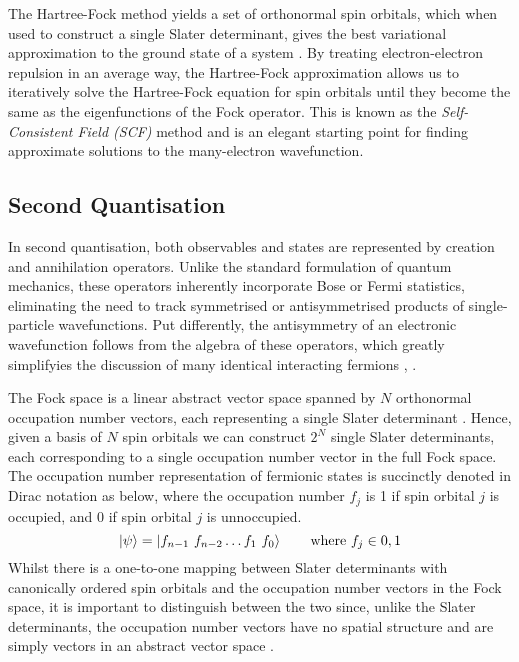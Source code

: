 The Hartree-Fock method yields a set of orthonormal spin orbitals, which when used to construct a single Slater determinant, gives the best variational approximation to the ground state of a system \cite{Atilla1996}. By treating electron-electron repulsion in an average way, the Hartree-Fock approximation allows us to iteratively solve the Hartree-Fock equation for spin orbitals until they become the same as the eigenfunctions of the Fock operator. This is known as the \textit{Self-Consistent Field (SCF)} method and is an elegant starting point for finding approximate solutions to the many-electron wavefunction.

\subsection{\label{second-quantisation}Second Quantisation}

In second quantisation, both observables and states are represented by creation and annihilation operators. Unlike the standard formulation of quantum mechanics, these operators inherently incorporate Bose or Fermi statistics, eliminating the need to track symmetrised or antisymmetrised products of single-particle wavefunctions. Put differently, the antisymmetry of an electronic wavefunction follows from the algebra of these operators, which greatly simplifyies the discussion of many identical interacting fermions \cite{Helgaker2000}, \cite{Fetter1972}.

The Fock space is a linear abstract vector space spanned by $N$ orthonormal occupation number vectors, each representing a single Slater determinant \cite{Helgaker2000}. Hence, given a basis of $N$ spin orbitals we can construct $2^N$ single Slater determinants, each corresponding to a single occupation number vector in the full Fock space. The occupation number representation of fermionic states is succinctly denoted in Dirac notation as below, where the occupation number $f_j$ is 1 if spin orbital $j$ is occupied, and 0 if spin orbital $j$ is unnoccupied.
\begin{equation*}
    \ket\psi = \ket{f_{n-1} \,\, f_{n-2} \dots f_{1} \,\, f_{0}} \qquad \text{where } f_{j} \in {0, 1}
\end{equation*}
Whilst there is a one-to-one mapping between Slater determinants with canonically ordered spin orbitals and the occupation number vectors in the Fock space, it is important to distinguish between the two since, unlike the Slater determinants, the occupation number vectors have no spatial structure and are simply vectors in an abstract vector space \cite{Helgaker2000}.

